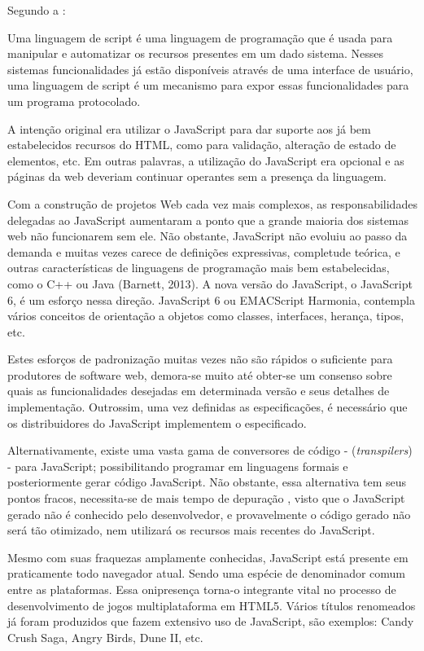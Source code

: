 \documentclass[
12pt,
a4paper,
portuges,
draft
]{report}
\renewenvironment{quote}
               {\list{}{\rightmargin\leftmargin}%
                \item\relax\fontsize{10}{12}}
               {\endlist}
\begin{document}
Segundo a \cite{ecmaSpecificaton}:
\begin{quote}
Uma linguagem de script é uma linguagem de programação que é
usada para manipular e automatizar os recursos presentes em um dado
sistema. Nesses sistemas funcionalidades já estão disponíveis
através de uma interface de usuário, uma linguagem de script é
um mecanismo para expor essas funcionalidades para um programa
protocolado.
\end{quote}

A intenção original era utilizar o JavaScript para dar suporte aos já
bem estabelecidos recursos do HTML, como para validação, alteração
de estado de elementos, etc. Em outras palavras, a utilização do
JavaScript era opcional e as páginas da web deveriam continuar
operantes sem a presença da linguagem.

Com a construção de projetos Web cada vez mais complexos,
as responsabilidades delegadas ao JavaScript aumentaram a ponto que a
grande maioria dos sistemas web não funcionarem sem ele. Não obstante,
JavaScript não evoluiu ao passo da demanda e muitas vezes carece de
definições expressivas, completude teórica, e outras características
de linguagens de programação mais bem estabelecidas, como o C++ ou
Java (Barnett, 2013). A nova versão do JavaScript, o JavaScript 6, é
um esforço nessa direção. JavaScript 6 ou EMACScript Harmonia,
contempla vários conceitos de orientação a objetos como classes,
interfaces, herança, tipos, etc.

Estes esforços de padronização muitas vezes não são rápidos
o suficiente para produtores de software web, demora-se muito até
obter-se um consenso sobre quais as funcionalidades desejadas em
determinada versão e seus detalhes de implementação. Outrossim, uma
vez definidas as especificações, é necessário que os distribuidores
do JavaScript implementem o especificado.

Alternativamente, existe uma vasta gama de conversores de código -
(\textit{transpilers}) - para JavaScript; possibilitando programar em
linguagens formais e posteriormente gerar código JavaScript. Não
obstante, essa alternativa tem seus pontos fracos, necessita-se de mais
tempo de depuração , visto que o JavaScript gerado não é conhecido
pelo desenvolvedor, e provavelmente o código gerado não será tão
otimizado, nem utilizará os recursos mais recentes do JavaScript.

Mesmo com suas fraquezas amplamente conhecidas, JavaScript está
presente em praticamente todo navegador atual. Sendo uma espécie de
denominador comum entre as plataformas. Essa onipresença torna-o
integrante vital no processo de desenvolvimento de jogos multiplataforma
em HTML5. Vários títulos renomeados já foram produzidos que fazem
extensivo uso de JavaScript, são exemplos: Candy Crush Saga, Angry
Birds, Dune II, etc.
\end{document}

